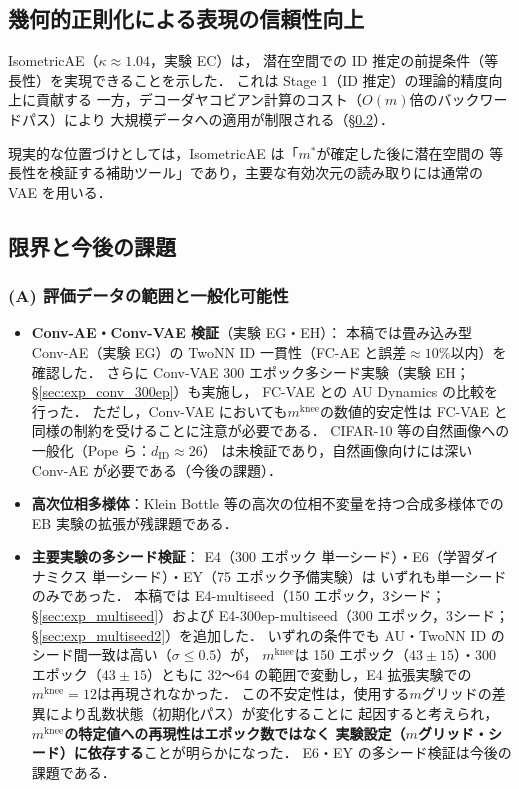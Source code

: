 \documentclass[11pt,a4paper]{jsarticle}
\newcommand{\dzopt}{m^*}
\newcommand{\kap}{\kappa}
\newcommand{\mknee}{m^{\mathrm{knee}}}
\begin{document}
\subsection{幾何的正則化による表現の信頼性向上}\label{sec:disc_isometric}

IsometricAE（$\kap \approx 1.04$，実験 EC）は，
潜在空間での ID 推定の前提条件（等長性）を実現できることを示した．
これは Stage 1（ID 推定）の理論的精度向上に貢献する
一方，デコーダヤコビアン計算のコスト（$O(m)$倍のバックワードパス）により
大規模データへの適用が制限される（§\ref{sec:disc_limitation}）．

現実的な位置づけとしては，IsometricAE は「$\dzopt$が確定した後に潜在空間の
等長性を検証する補助ツール」であり，主要な有効次元の読み取りには通常の VAE を用いる．

\subsection{限界と今後の課題}\label{sec:disc_limitation}

\subsubsection*{(A) 評価データの範囲と一般化可能性}

\begin{itemize}
  \item \textbf{Conv-AE・Conv-VAE 検証}（実験 EG・EH）：
        本稿では畳み込み型 Conv-AE（実験 EG）の TwoNN ID 一貫性（FC-AE と誤差$\approx 10\%$以内）を確認した．
        さらに Conv-VAE 300 エポック多シード実験（実験 EH；§\ref{sec:exp_conv_300ep}）も実施し，
        FC-VAE との AU Dynamics の比較を行った．
        ただし，Conv-VAE においても$\mknee$の数値的安定性は FC-VAE と同様の制約を受けることに注意が必要である．
        CIFAR-10 等の自然画像への一般化（Pope ら\cite{pope2021intrinsic}：$d_\mathrm{ID} \approx 26$）
        は未検証であり，自然画像向けには深い Conv-AE が必要である（今後の課題）．
  \item \textbf{高次位相多様体}：Klein Bottle 等の高次の位相不変量を持つ合成多様体での
        EB 実験の拡張が残課題である．
  \item \textbf{主要実験の多シード検証}：
        E4（300 エポック 単一シード）・E6（学習ダイナミクス 単一シード）・EY（75 エポック予備実験）は
        いずれも単一シードのみであった．
        本稿では E4-multiseed（150 エポック，3シード；§\ref{sec:exp_multiseed}）および
        E4-300ep-multiseed（300 エポック，3シード；§\ref{sec:exp_multiseed2}）を追加した．
        いずれの条件でも AU・TwoNN ID のシード間一致は高い（$\sigma \leq 0.5$）が，
        $\mknee$は 150 エポック（$43 \pm 15$）・300 エポック（$43 \pm 15$）ともに
        32〜64 の範囲で変動し，E4 拡張実験での$\mknee = 12$は再現されなかった．
        この不安定性は，使用する$m$グリッドの差異により乱数状態（初期化パス）が変化することに
        起因すると考えられ，\textbf{$\mknee$の特定値への再現性はエポック数ではなく
        実験設定（$m$グリッド・シード）に依存する}ことが明らかになった．
        E6・EY の多シード検証は今後の課題である．
\end{itemize}
\end{document}
